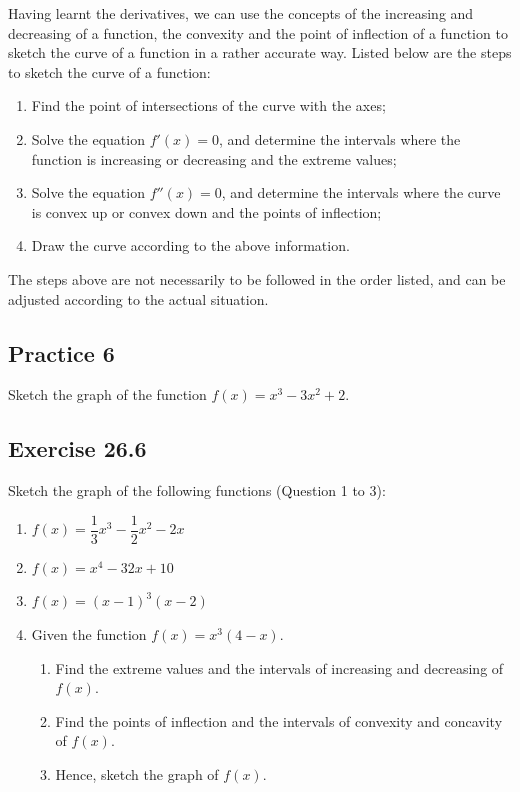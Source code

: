 \documentclass{report}
\begin{document}
Having learnt the derivatives, we can use the concepts of the increasing and
decreasing of a function, the convexity and the point of inflection of a
function to sketch the curve of a function in a rather accurate way. Listed
below are the steps to sketch the curve of a function:
\begin{enumerate}
    \item Find the point of intersections of the curve with the axes;
    \item Solve the equation $f'(x) = 0$, and determine the intervals where the function
          is increasing or decreasing and the extreme values;
    \item Solve the equation $f''(x) = 0$, and determine the intervals where the curve is
          convex up or convex down and the points of inflection;
    \item Draw the curve according to the above information.
\end{enumerate}
The steps above are not necessarily to be followed in the order listed, and can be adjusted according to the actual situation.

\subsection{Practice 6}

Sketch the graph of the function $f(x) = x^3 - 3x^2 + 2$.

\subsection{Exercise 26.6}

Sketch the graph of the following functions (Question 1 to 3):

\begin{enumerate}
    \item $f(x)=\dfrac{1}{3} x^3-\dfrac{1}{2} x^2-2 x$
    \item $f(x)=x^4-32 x+10$
    \item $f(x)=(x-1)^3(x-2)$
    \item Given the function $f(x) = x^3(4-x)$.
          \begin{enumerate}
              \item Find the extreme values and the intervals of increasing and decreasing of
                    $f(x)$.
              \item Find the points of inflection and the intervals of convexity and concavity of
                    $f(x)$.
              \item Hence, sketch the graph of $f(x)$.
          \end{enumerate}
\end{enumerate}
\end{document}
